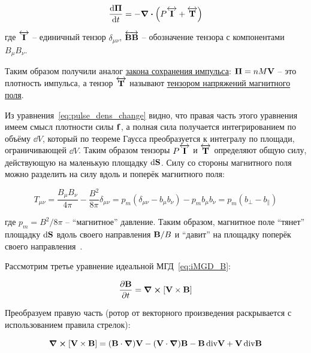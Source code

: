 \documentclass[10pt, a4paper]{article}
\begin{document}
\begin{equation}
	\label{eq:pulse_dens_change}
	\dv{\vb{\Pi}}{t} = - \div{\left( P\overleftrightarrow{\vb{I}} + \overleftrightarrow{\vb{T}} \right)}
\end{equation}

где $\overleftrightarrow{\vb{I}}$ -- единичный тензор $\delta_{\mu\nu}$, $\overleftrightarrow{\vb{BB}}$ -- обозначение тензора с компонентами $B_\mu B_\nu$.

Таким образом получили аналог \uline{закона сохранения импульса}: $\vb{\Pi}=nM\vb{V}$ -- это плотность импульса, а тензор $\overleftrightarrow{\vb{T}}$ называют \uline{тензором напряжений магнитного поля}. 	

Из уравнения~\eqref{eq:pulse_dens_change} видно, что правая часть этого уравнения имеем смысл плотности силы $\vb{f}$, а полная сила получается интегрированием по объёму $\dd V$, который по теореме Гаусса преобразуется к интегралу по площади, ограничивающей $\dd V$. Таким образом тензоры $P\overleftrightarrow{\vb{I}}$ и $\overleftrightarrow{\vb{T}}$ определяют общую силу, действующую на маленькую площадку $\dd\vb{S}$.
Силу со стороны магнитного поля можно разделить на силу вдоль и поперёк магнитного поля:

\begin{equation*}
	T_{\mu\nu} = \frac{B_\mu B_\nu}{4\pi}-\frac{B^2}{8\pi}\delta_{\mu\nu} = p_m \left( \delta_{\mu\nu} - b_\mu b_\nu \right) - p_m b_\mu b_\nu = p_m (b_\perp - b_\parallel)
\end{equation*}

где $p_m = B^2 / 8 \pi$ -- ``магнитное'' давление. Таким образом, магнитное поле ``тянет'' площадку $\dd \vb{S}$ вдоль своего направления $\vb{B}/B$ и ``давит'' на площадку поперёк своего направления~\cite{kotelnikov}.

Рассмотрим третье уравнение идеальной МГД~\eqref{eq:iMGD_B}:

\begin{equation*}
	\pdv{\vb{B}}{t} = \curl{[\vb{V}\times\vb{B}]}
\end{equation*}

Преобразуем правую часть (ротор от векторного произведения раскрывается с использованием правила стрелок):

\begin{equation*}
	\curl{[\vb{V}\times\vb{B}]} = (\vb{B}\cdot\grad)\vb{V} - (\vb{V}\cdot\grad)\vb{B} - \vb{B}\,\text{div}{\vb{V}} + \vb{V}\,\text{div}{\vb{B}}
\end{equation*}
\end{document}
